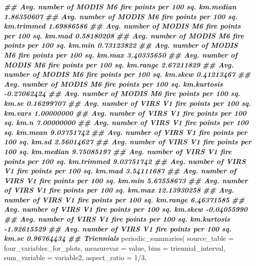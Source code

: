 \documentclass[10pt,landscape,a3paper]{article}
\newenvironment{Shaded}{\begin{snugshade}}{\end{snugshade}}
\newcommand{\AttributeTok}[1]{\textcolor[rgb]{0.77,0.63,0.00}{#1}}
\newcommand{\DecValTok}[1]{\textcolor[rgb]{0.00,0.00,0.81}{#1}}
\newcommand{\DocumentationTok}[1]{\textcolor[rgb]{0.56,0.35,0.01}{\textbf{\textit{#1}}}}
\newcommand{\FunctionTok}[1]{\textcolor[rgb]{0.00,0.00,0.00}{#1}}
\newcommand{\NormalTok}[1]{#1}
\newcommand{\SpecialCharTok}[1]{\textcolor[rgb]{0.00,0.00,0.00}{#1}}
\newcommand{\StringTok}[1]{\textcolor[rgb]{0.31,0.60,0.02}{#1}}
\begin{document}
\begin{Shaded}
\begin{Highlighting}[]
\DocumentationTok{\#\# Avg. number of MODIS M6 fire points per 100 sq. km.median            1.86350607}
\DocumentationTok{\#\# Avg. number of MODIS M6 fire points per 100 sq. km.trimmed           1.69886586}
\DocumentationTok{\#\# Avg. number of MODIS M6 fire points per 100 sq. km.mad               0.58180208}
\DocumentationTok{\#\# Avg. number of MODIS M6 fire points per 100 sq. km.min               0.73123822}
\DocumentationTok{\#\# Avg. number of MODIS M6 fire points per 100 sq. km.max               3.40335650}
\DocumentationTok{\#\# Avg. number of MODIS M6 fire points per 100 sq. km.range             2.67211829}
\DocumentationTok{\#\# Avg. number of MODIS M6 fire points per 100 sq. km.skew              0.41213467}
\DocumentationTok{\#\# Avg. number of MODIS M6 fire points per 100 sq. km.kurtosis         {-}0.27062424}
\DocumentationTok{\#\# Avg. number of MODIS M6 fire points per 100 sq. km.se                0.16299707}
\DocumentationTok{\#\# Avg. number of VIRS V1 fire points per 100 sq. km.vars               1.00000000}
\DocumentationTok{\#\# Avg. number of VIRS V1 fire points per 100 sq. km.n                  7.00000000}
\DocumentationTok{\#\# Avg. number of VIRS V1 fire points per 100 sq. km.mean               9.03751742}
\DocumentationTok{\#\# Avg. number of VIRS V1 fire points per 100 sq. km.sd                 2.56014627}
\DocumentationTok{\#\# Avg. number of VIRS V1 fire points per 100 sq. km.median             9.75085197}
\DocumentationTok{\#\# Avg. number of VIRS V1 fire points per 100 sq. km.trimmed            9.03751742}
\DocumentationTok{\#\# Avg. number of VIRS V1 fire points per 100 sq. km.mad                3.54111687}
\DocumentationTok{\#\# Avg. number of VIRS V1 fire points per 100 sq. km.min                5.67558673}
\DocumentationTok{\#\# Avg. number of VIRS V1 fire points per 100 sq. km.max               12.13930258}
\DocumentationTok{\#\# Avg. number of VIRS V1 fire points per 100 sq. km.range              6.46371585}
\DocumentationTok{\#\# Avg. number of VIRS V1 fire points per 100 sq. km.skew              {-}0.04055990}
\DocumentationTok{\#\# Avg. number of VIRS V1 fire points per 100 sq. km.kurtosis          {-}1.92615529}
\DocumentationTok{\#\# Avg. number of VIRS V1 fire points per 100 sq. km.se                 0.96764434}
\DocumentationTok{\#\# Triennials}
\FunctionTok{periodic\_summaries}\NormalTok{(}
  \AttributeTok{source\_table =}\NormalTok{ four\_variables\_for\_plots, }\AttributeTok{measurevar =} \StringTok{\textquotesingle{}value\textquotesingle{}}\NormalTok{,}
  \AttributeTok{bins =} \StringTok{\textquotesingle{}triennial\_interval\textquotesingle{}}\NormalTok{, }\AttributeTok{sum\_variable =} \StringTok{\textquotesingle{}variable2\textquotesingle{}}\NormalTok{, }\AttributeTok{aspect\_ratio =} \DecValTok{1}\SpecialCharTok{/}\DecValTok{3}\NormalTok{,}

\end{Highlighting}
\end{Shaded}
\end{document}
